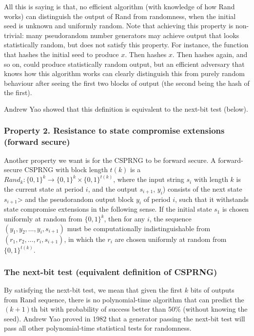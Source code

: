 \documentclass{article}
\begin{document}
All this is saying is that, no efficient algorithm (with knowledge of how Rand works) can distinguish the output of Rand from randomness, when the initial seed is unknown and uniformly random. Note that achieving this property is non-trivial: many pseudorandom number generators may achieve output that looks statistically random, but does not satisfy this property. For instance, the function that hashes the initial seed to produce $x$. Then hashes $x$. Then hashes again, and so on, could produce statistically random output, but an efficient adversary that knows how this algorithm works can clearly distinguish this from purely random behaviour after seeing the first two blocks of output (the second being the hash of the first).

Andrew Yao showed that this definition is equivalent to the next-bit test (below).

\subsubsection*{Property 2. Resistance to state compromise extensions (forward secure)}
Another property we want is for the CSPRNG to be forward secure. A forward-secure CSPRNG with block length $t(k)$ is a $Rand_{k} \colon \{0,1\}^k \to \{0,1\}^k \times \{0,1\}^{t(k)}$, where the input string $s_i$ with length $k$ is the current state at period $i$, and the output $s_{i+1}$, $y_i$) consists of the next state $s_{i+1}$> and the pseudorandom output block $y_i$ of period $i$, such that it withstands state compromise extensions in the following sense. If the initial state $s_1$ is chosen uniformly at random from $\{0,1\}^k$, then for any $i$, the sequence $(y_1, y_2,\dots, y_i,s_{i+1})$ must be computationally indistinguishable from $(r_1,r_2,\dots,r_i,s_{i+1})$, in which the $r_i$ are chosen uniformly at random from $\{0,1\}^{t(k)}$.

\subsubsection*{The next-bit test (equivalent definition of CSPRNG)}
By satisfying the next-bit test, we mean that given the first $k$ bits of outputs from Rand sequence, there is no polynomial-time algorithm that can predict the $(k+1)$th bit with probability of success better than 50\% (without knowing the seed). Andrew Yao proved in 1982 that a generator passing the next-bit test will pass all other polynomial-time statistical tests for randomness.
\end{document}

